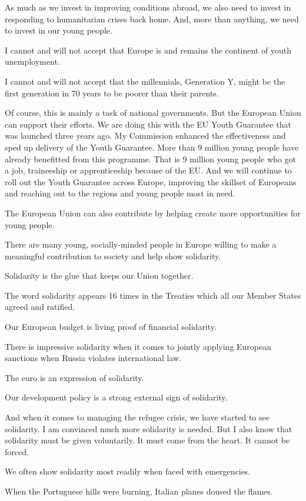 \documentclass[a4paper,11pt]{article}
\begin{document}
As much as we invest in improving conditions abroad, we also need to invest in responding to humanitarian crises back home. And, more than anything, we need to invest in our young people.

I cannot and will not accept that Europe is and remains the continent of youth unemployment.

I cannot and will not accept that the millennials, Generation Y, might be the first generation in 70 years to be poorer than their parents.

Of course, this is mainly a task of national governments. But the European Union can support their efforts. We are doing this with the EU Youth Guarantee that was launched three years ago. My Commission enhanced the effectiveness and sped up delivery of the Youth Guarantee. More than 9 million young people have already benefitted from this programme. That is 9 million young people who got a job, traineeship or apprenticeship because of the EU. And we will continue to roll out the Youth Guarantee across Europe, improving the skillset of Europeans and reaching out to the regions and young people most in need.

The European Union can also contribute by helping create more opportunities for young people.

There are many young, socially-minded people in Europe willing to make a meaningful contribution to society and help show solidarity.

Solidarity is the glue that keeps our Union together.

The word solidarity appears 16 times in the Treaties which all our Member States agreed and ratified.

Our European budget is living proof of financial solidarity.

There is impressive solidarity when it comes to jointly applying European sanctions when Russia violates international law.

The euro is an expression of solidarity.

Our development policy is a strong external sign of solidarity.

And when it comes to managing the refugee crisis, we have started to see solidarity. I am convinced much more solidarity is needed. But I also know that solidarity must be given voluntarily. It must come from the heart. It cannot be forced.

We often show solidarity most readily when faced with emergencies.

When the Portuguese hills were burning, Italian planes doused the flames.
\end{document}
